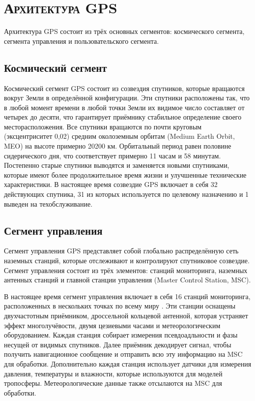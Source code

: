 \section{\textsc{Архитектура GPS}}

Архитектура GPS состоит из трёх основных сегментов: космического сегмента, сегмента управления и пользовательского сегмента.

\subsection*{\textbf{Космический сегмент}}

Космический сегмент GPS состоит из созвездия спутников, которые вращаются вокруг Земли в определённой конфигурации.
Эти спутники расположены так, что в любой момент времени в любой точки Земли их видимое число составляет от четырех до десяти, что гарантирует приёмнику стабильное определение своего месторасположения.  
Все спутники вращаются по почти круговым (эксцентриситет 0,02) средним околоземным орбитам (Medium Earth Orbit, MEO) на высоте примерно 20200 км. 
Орбитальный период равен половине сидерического дня, что соответствует примерно 11 часам и 58 минутам.  
Постепенно старые спутники выводятся и заменяется новыми спутниками, которые имеют более продолжительное время жизни и улучшенные технические характеристики. 
В настоящее время созвездие GPS включает в себя 32 действующих спутника, 31 из которых используется по целевому назначению и 1 выведен на техобслуживание. 

\subsection*{\textbf{Сегмент управления}}

Сегмент управления GPS представляет собой глобально распределённую сеть наземных станций, которые отслеживают и контролируют спутниковое созвездие.
Сегмент управления состоит из трёх элементов: станций мониторинга, наземных антенных станций и главной станции управления (Master Control Station, MSC).

В настоящее время сегмент управления включает в себя 16 станций мониторинга, расположенных в нескольких точках по всему миру \cite{GPS}.
Эти станции оснащены двухчастотным приёмником, дроссельной кольцевой антенной, которая устраняет эффект многолучёвости, двумя цезиевыми часами и метеорологическим оборудованием.      
Каждая станция собирает измерения псевдоадльности и фазы несущей от видимых спутников.   
Далее приёмник декодирует сигнал, чтобы получить навигационное сообщение и отправить всю эту информацию на MSC для обработки. 
Дополнительно каждая станция использует датчики для измерения давления, температуры и влажности, которые используются для моделей тропосферы.
Метеорологические данные также отсылаются на MSC для обработки.  

